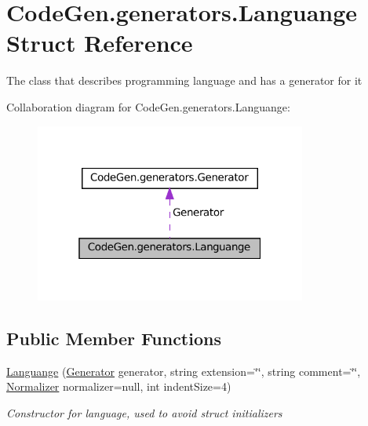 \hypertarget{structCodeGen_1_1generators_1_1Languange}{}\section{Code\+Gen.\+generators.\+Languange Struct Reference}
\label{structCodeGen_1_1generators_1_1Languange}


The class that describes programming language and has a generator for it  




Collaboration diagram for Code\+Gen.\+generators.\+Languange\+:
\nopagebreak
\begin{figure}[H]
\begin{center}
\leavevmode
\includegraphics[width=253pt]{structCodeGen_1_1generators_1_1Languange__coll__graph}
\end{center}
\end{figure}
\subsection*{Public Member Functions}
\begin{DoxyCompactItemize}
\item 
\mbox{\hyperlink{structCodeGen_1_1generators_1_1Languange_a89fa98041473b18a7df845e14edcba07}{Languange}} (\mbox{\hyperlink{classCodeGen_1_1generators_1_1Generator}{Generator}} generator, string extension=\char`\"{}\char`\"{}, string comment=\char`\"{}\char`\"{}, \mbox{\hyperlink{classCodeGen_1_1generators_1_1Normalizer}{Normalizer}} normalizer=null, int indent\+Size=4)
\begin{DoxyCompactList}\small\item\em Constructor for language, used to avoid struct initializers \end{DoxyCompactList}\end{DoxyCompactItemize}
